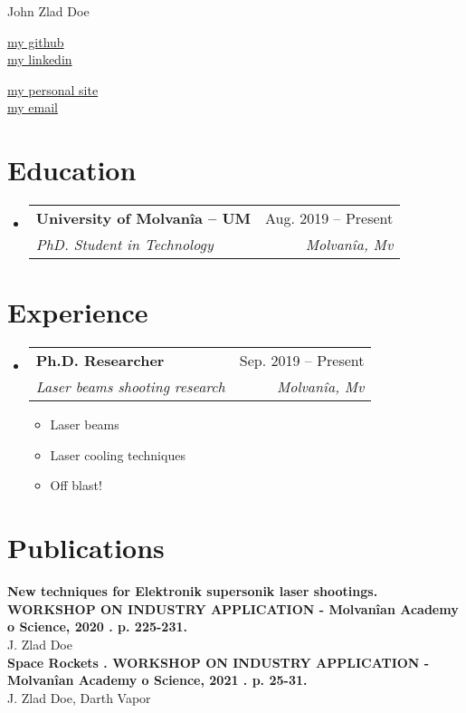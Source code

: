 \documentclass[letterpaper,10pt]{article}
\makeatletter
\newcommand{\resumeItem}[1]{
  \item\small{
    {#1 \vspace{-2pt}}
  }
}
\newcommand{\resumeSubheading}[4]{
  \vspace{-2pt}\item
    \begin{tabular*}{0.97\textwidth}[t]{l@{\extracolsep{\fill}}r}
      \textbf{#1} & #2 \\
      \textit{\small#3} & \textit{\small #4} \\
    \end{tabular*}\vspace{-7pt}
}
\newcommand{\resumeSubHeadingListStart}{\begin{itemize}[leftmargin=0.15in, label={}]}
\newcommand{\resumeSubHeadingListEnd}{\end{itemize}}
\newcommand{\resumeItemListStart}{\begin{itemize}}
\newcommand{\resumeItemListEnd}{\end{itemize}\vspace{-5pt}}
\makeatother
\begin{document}
\begin{center}
    {\LARGE John Zlad Doe} \\ \vspace{2pt}
    \begin{multicols}{2}
    \begin{flushleft}
    \href{{your github page link}}{my github}\\
    \href{{your linkedin page link}}{my linkedin}
    \end{flushleft}
    
    \begin{flushright}
    \href{{your personal websit link}}{my personal site}\\
    \href{mailto:{your email adress}}{my email}
    \end{flushright}
    \end{multicols}
\end{center}


\vspace{-2pt}
\section{Education}
  \resumeSubHeadingListStart
      \resumeSubheading
      {University of Molvanîa -- UM}{Aug. 2019 -- Present}
      {PhD. Student in Technology}{Molvanîa, Mv}

  \resumeSubHeadingListEnd


\section{Experience}
  \resumeSubHeadingListStart
    \resumeSubheading
      {Ph.D. Researcher}{Sep. 2019 -- Present}
      {Laser beams shooting research}{Molvanîa, Mv}
      \resumeItemListStart
        \resumeItem{Laser beams}
        \resumeItem{Laser cooling techniques}
        \resumeItem{Off blast!}
    \resumeItemListEnd

  \resumeSubHeadingListEnd

\section{Publications}
 \begin{itemize}[leftmargin=0.15in, label={}]
    \small{\item{
    \textbf{New techniques for Elektronik supersonik laser shootings. WORKSHOP ON INDUSTRY APPLICATION - Molvanîan Academy o Science, 2020 . p. 225-231.}{\\J. Zlad Doe}\\
        \textbf{Space Rockets . WORKSHOP ON INDUSTRY APPLICATION - Molvanîan Academy o Science, 2021 . p. 25-31.}{\\J. Zlad Doe, Darth Vapor}\\
\ 
}}
 \end{itemize}
\end{document}
